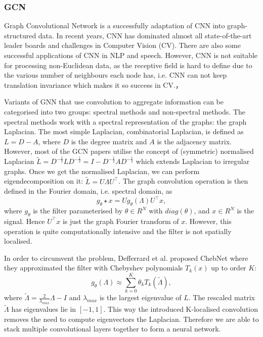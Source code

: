 \documentclass[12pt]{report}
\begin{document}
\subsubsection{GCN}
Graph Convolutional Network \cite{kipf_semi-supervised_2016} is a successfully adaptation of CNN into graph-structured data. In recent years, CNN has dominated almost all state-of-the-art leader boards and challenges in Computer Vision (CV). There are also some successful applications of CNN in NLP and speech. However, CNN is not suitable for processing non-Euclidean data, as the receptive field is hard to define due to the various number of neighbours each node has, i.e. CNN can not keep translation invariance which makes it so success in CV.，

Variants of GNN that use convolution to aggregate information can be categorised into two groups: spectral methods and non-spectral methods. The spectral methods
work with a spectral representation of the graphs: the graph Laplacian. The most simple Laplacian, combinatorial Laplacian, is defined as $L = D - A$, where $D$ is the degree matrix and $A$ is the adjacency matrix. However, most of the GCN papers utilise the concept of (symmetric) normalised Laplacian $\tilde{L} = D^{-\frac{1}{2}}LD^{-\frac{1}{2}}=I-D^{-\frac{1}{2}}AD^{-\frac{1}{2}}$ which extends Laplacian to irregular graphs. Once we get the normalised Laplacian, we can perform eigendecomposition on it: $\tilde{L}=U\Lambda U^\top$. The graph convolution operation is then defined in the Fourier domain, i.e. spectral domain, as
\[g_\theta \star x = Ug_\theta(\Lambda)U^\top x,\]
where $g_\theta$ is the filter parameterised by $\theta \in R^N$ with $diag(\theta)$, and $x \in R^N$ is the signal. Hence $U^\top x$ is just the graph Fourier transform of $x$. However, this operation is quite computationally intensive and the filter is not spatially localised.

In order to circumvent the problem, Defferrard et al. \cite{defferrard_convolutional_2016} proposed ChebNet where they approximated the filter with Chebyshev polynomials $T_k(x)$ up to order $K$:
\[g_\theta(\Lambda) \approx \sum_{k=0}^K \theta_k T_k(\tilde{\Lambda}),\]
where $\tilde{\Lambda} = \frac{2}{\lambda_{max}}\Lambda-I$ and $\lambda_{max}$ is the largest eigenvalue of $L$. The rescaled matrix $\tilde{\Lambda}$ has eigenvalues lie in $[-1, 1]$.
This way the introduced K-localised convolution removes the need to compute eigenvectors the Laplacian. Therefore we are able to stack multiple convolutional layers together to form a neural network.
\end{document}
